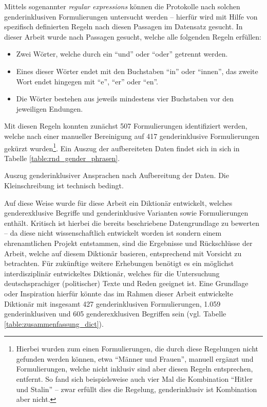 \documentclass[12pt, 
    twoside=false, 
    bibliography=totoc, 
    numbers=endperiod, 
    headings=normal, 
    toc=chapterentrydotfill
    ]{scrbook}
\begin{document}
Mittels sogenannter \emph{regular expressions} \parencite{thompson_1968} können die Protokolle nach solchen genderinklusiven Formulierungen untersucht werden -- hierfür wird mit Hilfe von spezifisch definierten Regeln nach diesen Passagen im Datensatz gesucht. In dieser Arbeit wurde nach Passagen gesucht, welche alle folgenden Regeln erfüllen:
\begin{itemize}
    \setlength\itemsep{0em}
    \item Zwei Wörter, welche durch ein \enquote{und} oder \enquote{oder} getrennt werden.
    \item Eines dieser Wörter endet mit den Buchstaben \enquote{in} oder \enquote{innen}, das zweite Wort endet hingegen mit \enquote{e}, \enquote{er} oder \enquote{en}.
    \item Die Wörter bestehen aus jeweils mindestens vier Buchstaben vor den jeweiligen Endungen.
\end{itemize}

Mit diesen Regeln konnten zunächst 507 Formulierungen identifiziert werden, welche nach einer manueller Bereinigung auf 417 genderinklusive Formulierungen gekürzt wurden\footnote{Hierbei wurden zum einen Formulierungen, die durch diese Regelungen nicht gefunden werden können, etwa \enquote{Männer und Frauen}, manuell ergänzt und Formulierungen, welche nicht inklusiv sind aber diesen Regeln entsprechen, entfernt. So fand sich beispielsweise auch vier Mal die Kombination \enquote{Hitler und Stalin} -- zwar erfüllt dies die Regelung, genderinklusiv ist Kombination aber nicht.}. Ein Auszug der aufbereiteten Daten findet sich in sich in Tabelle \ref{table:rnd_gender_phrasen}. 

%

\begin{table}[htb]
    \centering
    \caption[Auszug genderinklusiver Ansprachen nach Aufbereitung der Daten]{Auszug genderinklusiver Ansprachen nach Aufbereitung der Daten. 
    Die Kleinschreibung ist technisch bedingt.}
    
    \label{table:rnd_gender_phrasen}
\end{table}

%

Auf diese Weise wurde für diese Arbeit ein Diktionär entwickelt, welches genderexklusive Begriffe und genderinklusive Varianten sowie Formulierungen enthält. Kritisch ist hierbei die bereits beschriebene Datengrundlage zu bewerten -- da diese nicht wissenschaftlich entwickelt worden ist sondern einem ehrenamtlichen Projekt entstammen, sind die Ergebnisse und Rückschlüsse der Arbeit, welche auf diesem Diktionär basieren, entsprechend mit Vorsicht zu betrachten.
Für zukünftige weitere Erhebungen benötigt es ein möglichst interdisziplinär entwickeltes Diktionär, welches für die Untersuchung deutschsprachiger (politischer) Texte und Reden geeignet ist. Eine Grundlage oder Inspiration hierfür könnte das im Rahmen dieser Arbeit entwickelte Diktionär mit insgesamt 427 genderinklusiven Formulierungen, 1.059 genderinklusiven und 605 genderexklusiven Begriffen sein (vgl. Tabelle \ref{table:zusammenfassung_dict}).
\end{document}
